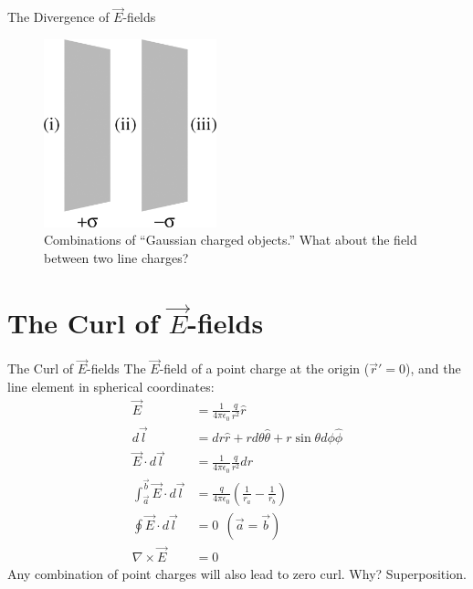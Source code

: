 \documentclass{beamer}
\begin{document}
\begin{frame}{The Divergence of $\vec{E}$-fields}
\begin{figure}
\centering
\includegraphics[width=5cm]{figures/2_23.jpg}
\caption{\label{fig:cyl3} Combinations of ``Gaussian charged objects.''  What about the field between two line charges?}
\end{figure}
\end{frame}

\section{The Curl of $\vec{E}$-fields}

\begin{frame}{The Curl of $\vec{E}$-fields}
The $\vec{E}$-field of a point charge at the origin ($\vec{r}' = 0$), and the line element in spherical coordinates:
\begin{align}
\vec{E} &= \frac{1}{4\pi\epsilon_0} \frac{q}{r^2} \hat{r} \\
d\vec{l} &= dr\hat{r} + rd\theta \hat{\theta} + r\sin\theta d\phi \hat{\phi} \\
\vec{E} \cdot d\vec{l} &= \frac{1}{4\pi\epsilon_0} \frac{q}{r^2} dr \\
\int_{\vec{a}}^{\vec{b}} \vec{E} \cdot d\vec{l} &= \frac{q}{4\pi\epsilon_0} \left(\frac{1}{r_a} - \frac{1}{r_b} \right) \\
\oint \vec{E} \cdot d\vec{l} &=  0 ~~ (\vec{a} = \vec{b}) \\
\nabla \times \vec{E} &= 0
\end{align}
Any combination of point charges will also lead to zero curl.  Why?  Superposition.
\end{frame}
\end{document}
